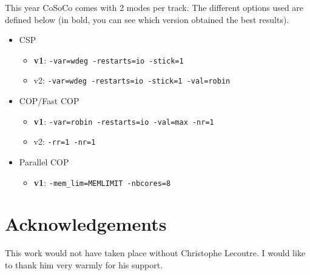 \documentclass{llncs}
\begin{document}
    \medskip
    This year CoSoCo comes with 2 modes per track. The different options used are defined below (in bold, you can see which version obtained the best results).

    \begin{itemize}
        \item     CSP
        \begin{itemize}
            \item   {\bf v1}: {\tt -var=wdeg -restarts=io -stick=1}
            \item v2: {\tt -var=wdeg -restarts=io -stick=1 -val=robin}
        \end{itemize}
        \item COP/Fast COP
        \begin{itemize}
            \item {\bf v1}: {\tt -var=robin -restarts=io -val=max -nr=1}
            \item v2: {\tt -rr=1 -nr=1}
        \end{itemize}
        \item Parallel COP
        \begin{itemize}
            \item {\bf v1}: {\tt  -mem\_lim=MEMLIMIT -nbcores=8}
        \end{itemize}
    \end{itemize}





    \section*{Acknowledgements}
    This work would not have taken place without Christophe Lecoutre. I would like to thank him very warmly for his support.

    
    
\end{document}

